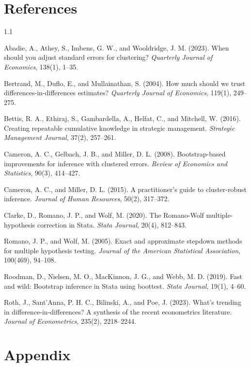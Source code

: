 \documentclass[12pt]{article}
\begin{document}
\section*{References}
\begin{spacing}{1.1}
\small
\setlength{\parindent}{-0.3in}\setlength{\leftskip}{0.3in}

\indent Abadie, A., Athey, S., Imbens, G. W., and Wooldridge, J. M. (2023). When should you adjust standard errors for clustering? \textit{Quarterly Journal of Economics}, 138(1), 1--35.

Bertrand, M., Duflo, E., and Mullainathan, S. (2004). How much should we trust differences-in-differences estimates? \textit{Quarterly Journal of Economics}, 119(1), 249--275.

Bettis, R. A., Ethiraj, S., Gambardella, A., Helfat, C., and Mitchell, W. (2016). Creating repeatable cumulative knowledge in strategic management. \textit{Strategic Management Journal}, 37(2), 257--261.

Cameron, A. C., Gelbach, J. B., and Miller, D. L. (2008). Bootstrap-based improvements for inference with clustered errors. \textit{Review of Economics and Statistics}, 90(3), 414--427.

Cameron, A. C., and Miller, D. L. (2015). A practitioner's guide to cluster-robust inference. \textit{Journal of Human Resources}, 50(2), 317--372.

Clarke, D., Romano, J. P., and Wolf, M. (2020). The Romano-Wolf multiple-hypothesis correction in Stata. \textit{Stata Journal}, 20(4), 812--843.

Romano, J. P., and Wolf, M. (2005). Exact and approximate stepdown methods for multiple hypothesis testing. \textit{Journal of the American Statistical Association}, 100(469), 94--108.

Roodman, D., Nielsen, M. O., MacKinnon, J. G., and Webb, M. D. (2019). Fast and wild: Bootstrap inference in Stata using boottest. \textit{Stata Journal}, 19(1), 4--60.

Roth, J., Sant'Anna, P. H. C., Bilinski, A., and Poe, J. (2023). What's trending in difference-in-differences? A synthesis of the recent econometrics literature. \textit{Journal of Econometrics}, 235(2), 2218--2244.
\end{spacing}

\appendix
\setcounter{table}{0}
\renewcommand{\thetable}{A\arabic{table}}
\section*{Appendix}
\end{document}
